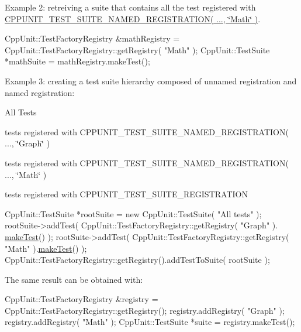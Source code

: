 Example 2\-: retreiving a suite that contains all the test registered with \hyperlink{_helper_macros_8h_a028a5855a40ad3836e2a26aa48cd4c91}{C\-P\-P\-U\-N\-I\-T\-\_\-\-T\-E\-S\-T\-\_\-\-S\-U\-I\-T\-E\-\_\-\-N\-A\-M\-E\-D\-\_\-\-R\-E\-G\-I\-S\-T\-R\-A\-T\-I\-O\-N( ..., \char`\"{}\-Math\char`\"{} )}. 
\begin{DoxyCode}
CppUnit::TestFactoryRegistry &mathRegistry = CppUnit::TestFactoryRegistry::getRegistry( \textcolor{stringliteral}{"Math"} );
CppUnit::TestSuite *mathSuite = mathRegistry.makeTest();
\end{DoxyCode}


Example 3\-: creating a test suite hierarchy composed of unnamed registration and named registration\-:
\begin{DoxyItemize}
\item All Tests
\begin{DoxyItemize}
\item tests registered with C\-P\-P\-U\-N\-I\-T\-\_\-\-T\-E\-S\-T\-\_\-\-S\-U\-I\-T\-E\-\_\-\-N\-A\-M\-E\-D\-\_\-\-R\-E\-G\-I\-S\-T\-R\-A\-T\-I\-O\-N( ..., \char`\"{}\-Graph\char`\"{} )
\item tests registered with C\-P\-P\-U\-N\-I\-T\-\_\-\-T\-E\-S\-T\-\_\-\-S\-U\-I\-T\-E\-\_\-\-N\-A\-M\-E\-D\-\_\-\-R\-E\-G\-I\-S\-T\-R\-A\-T\-I\-O\-N( ..., \char`\"{}\-Math\char`\"{} )
\item tests registered with C\-P\-P\-U\-N\-I\-T\-\_\-\-T\-E\-S\-T\-\_\-\-S\-U\-I\-T\-E\-\_\-\-R\-E\-G\-I\-S\-T\-R\-A\-T\-I\-O\-N
\end{DoxyItemize}
\end{DoxyItemize}


\begin{DoxyCode}
CppUnit::TestSuite *rootSuite = \textcolor{keyword}{new} CppUnit::TestSuite( \textcolor{stringliteral}{"All tests"} );
rootSuite->addTest( CppUnit::TestFactoryRegistry::getRegistry( \textcolor{stringliteral}{"Graph"} ).
      \hyperlink{class_test_factory_registry_a75fd01e6d565fb0f576ed1a887655089}{makeTest}() );
rootSuite->addTest( CppUnit::TestFactoryRegistry::getRegistry( \textcolor{stringliteral}{"Math"} ).\hyperlink{class_test_factory_registry_a75fd01e6d565fb0f576ed1a887655089}{makeTest}() );
CppUnit::TestFactoryRegistry::getRegistry().addTestToSuite( rootSuite );
\end{DoxyCode}


The same result can be obtained with\-: 
\begin{DoxyCode}
CppUnit::TestFactoryRegistry &registry = CppUnit::TestFactoryRegistry::getRegistry();
registry.addRegistry( \textcolor{stringliteral}{"Graph"} );
registry.addRegistry( \textcolor{stringliteral}{"Math"} );
CppUnit::TestSuite *suite = registry.makeTest();
\end{DoxyCode}


